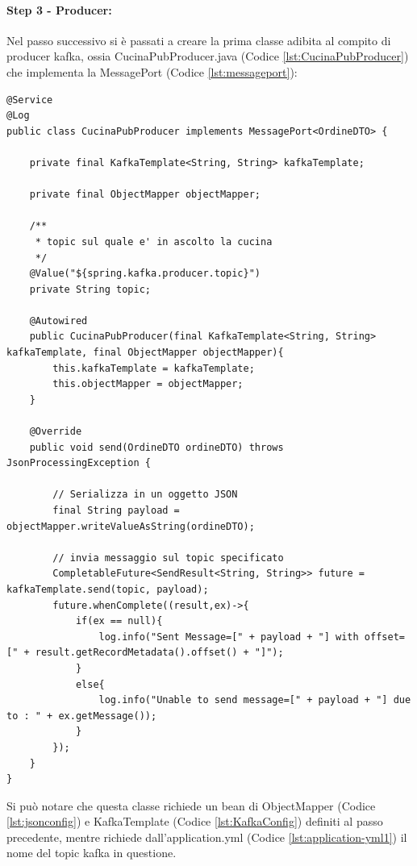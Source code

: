 \paragraph{Step 3 - Producer:}
Nel passo successivo si è passati a creare la prima classe adibita al compito di producer kafka, ossia CucinaPubProducer.java (Codice \vref{lst:CucinaPubProducer}) che implementa la MessagePort (Codice \vref{lst:messageport}):
\begin{lstlisting}[style=myJava, 
    caption={Classe del producer kafka CucinaPubProducer.java}, label=lst:CucinaPubProducer, 
    emph={[2] kafkaTemplate , objectMapper, topic, payload, log },
    emphstyle={[2]\color{codeDarkMagenta}},
    emph={[3] send },
    emphstyle={[3]\color{codeCyan}}]
@Service
@Log
public class CucinaPubProducer implements MessagePort<OrdineDTO> {

    private final KafkaTemplate<String, String> kafkaTemplate;

    private final ObjectMapper objectMapper;

    /**
     * topic sul quale e' in ascolto la cucina
     */
    @Value("${spring.kafka.producer.topic}")
    private String topic;

    @Autowired
    public CucinaPubProducer(final KafkaTemplate<String, String> kafkaTemplate, final ObjectMapper objectMapper){
        this.kafkaTemplate = kafkaTemplate;
        this.objectMapper = objectMapper;
    }

    @Override
    public void send(OrdineDTO ordineDTO) throws JsonProcessingException {

        // Serializza in un oggetto JSON
        final String payload = objectMapper.writeValueAsString(ordineDTO);

        // invia messaggio sul topic specificato
        CompletableFuture<SendResult<String, String>> future = kafkaTemplate.send(topic, payload);
        future.whenComplete((result,ex)->{
            if(ex == null){
                log.info("Sent Message=[" + payload + "] with offset=[" + result.getRecordMetadata().offset() + "]");
            }
            else{
                log.info("Unable to send message=[" + payload + "] due to : " + ex.getMessage());
            }
        });
    }
}
\end{lstlisting}
Si può notare che questa classe richiede un bean di ObjectMapper (Codice \vref{lst:jsonconfig}) e KafkaTemplate (Codice \vref{lst:KafkaConfig}) definiti al passo precedente, mentre richiede dall’application.yml (Codice \vref{lst:application-yml1}) il nome del topic kafka in questione.
